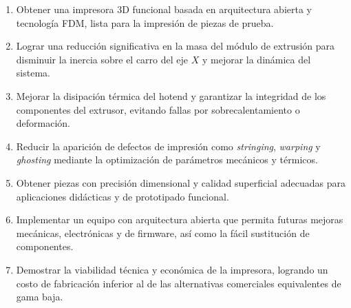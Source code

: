 \begin{enumerate}

\item Obtener una impresora 3D funcional basada en arquitectura abierta y tecnología FDM, lista para la impresión de piezas de prueba.

\item Lograr una reducción significativa en la masa del módulo de extrusión 
para disminuir la inercia sobre el carro del eje \(X\) y mejorar la dinámica 
del sistema.

\item Mejorar la disipación térmica del hotend y garantizar la integridad de 
los componentes del extrusor, evitando fallas por sobrecalentamiento o 
deformación.

\item Reducir la aparición de defectos de impresión como \textit{stringing}, \textit{warping} y \textit{ghosting} mediante la optimización de parámetros mecánicos y térmicos.

\item Obtener piezas con precisión dimensional y calidad superficial adecuadas para aplicaciones didácticas y de prototipado funcional.

\item Implementar un equipo con arquitectura abierta que permita futuras 
mejoras mecánicas, electrónicas y de firmware, así como la fácil sustitución 
de componentes.

\item Demostrar la viabilidad técnica y económica de la impresora, logrando 
un costo de fabricación inferior al de las alternativas comerciales 
equivalentes de gama baja.


\end{enumerate}


